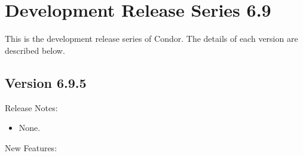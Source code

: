 
\section{\label{sec:History-6-9}Development Release Series 6.9}

This is the development release series of Condor.
The details of each version are described below.

\subsection*{\label{sec:New-6-9-5}Version 6.9.5}

\noindent Release Notes:

\begin{itemize}

\item None.

\end{itemize}


\noindent New Features:

